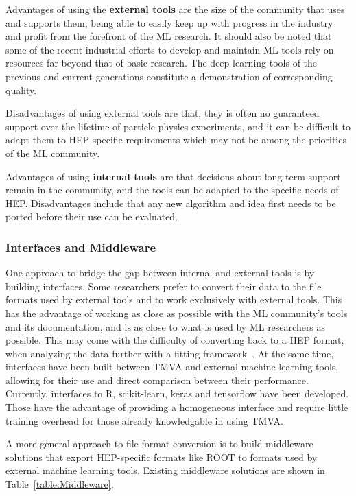 Advantages of using the {\bf external tools} are the size of the community that uses and supports them, being able to easily keep up with progress in the industry and profit from the forefront of the ML research.
It should also be noted that some of the recent industrial efforts to develop and maintain ML-tools rely on resources far beyond that of basic research. The deep learning tools of the previous and current generations constitute a demonstration of corresponding quality.

Disadvantages of using external tools are that, they is often no guaranteed support over the lifetime of particle physics experiments, and it can be difficult to adapt them to HEP specific requirements which may not be among the priorities of the ML community.

Advantages of using {\bf internal tools} are that decisions about long-term support remain in the community, and the tools can be adapted to the specific needs of HEP. Disadvantages include that any new algorithm and idea first needs to be ported before their use can be evaluated.

\subsubsection{Interfaces and Middleware}

One approach to bridge the gap between internal and external tools is by building interfaces. Some researchers prefer to convert their data to the file formats used by external tools and to work exclusively with external tools. This has the advantage of working as close as possible with the ML community's tools and its documentation, and is as close to what is used by ML researchers as possible. This may come with the difficulty of converting back to a HEP format, when analyzing the data further with a fitting framework~\cite{RooFit, RooStats, HistFactory}.
At the same time, interfaces have been built between TMVA and external machine learning tools, allowing for their use and direct comparison between their performance. Currently, interfaces to R, scikit-learn, keras and tensorflow have been developed. Those have the advantage of providing a homogeneous interface and require little training overhead for those already knowledgable in using TMVA.

A more general approach to file format conversion is to build middleware solutions that export HEP-specific formats like ROOT to formats used by external machine learning tools.
Existing middleware solutions are shown in Table~\ref{table:Middleware}.

